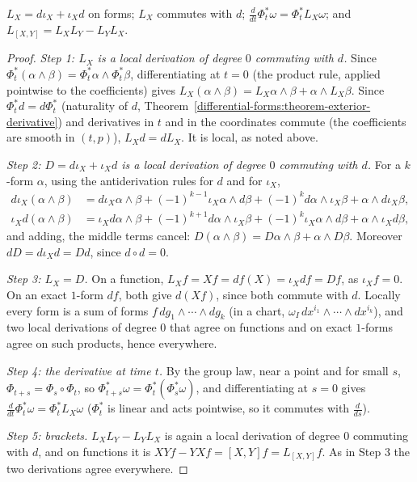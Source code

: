 \begin{proposition}\label{differential-forms:proposition-cartan}
$L_X = d\iota_X + \iota_Xd$ on forms; $L_X$ commutes with $d$; $\frac{d}{dt}\Phi_t^*\omega = \Phi_t^*L_X\omega$; and $L_{[X,Y]} = L_XL_Y - L_YL_X$.
\end{proposition}

\begin{proof}
\emph{Step 1: $L_X$ is a local derivation of degree $0$ commuting with $d$.} Since $\Phi_t^*(\alpha \wedge \beta) = \Phi_t^*\alpha \wedge \Phi_t^*\beta$, differentiating at $t = 0$ (the product
rule, applied pointwise to the coefficients) gives $L_X(\alpha \wedge \beta) = L_X\alpha \wedge \beta + \alpha \wedge L_X\beta$. Since $\Phi_t^*d = d\Phi_t^*$ (naturality of $d$,
Theorem~\ref{differential-forms:theorem-exterior-derivative}) and derivatives in $t$ and in the coordinates commute (the coefficients are smooth in $(t, p)$), $L_Xd = dL_X$. It is local,
as noted above.

\emph{Step 2: $D = d\iota_X + \iota_Xd$ is a local derivation of degree $0$ commuting with $d$.} For a $k$-form $\alpha$, using the antiderivation rules for $d$ and for $\iota_X$,
\[
\begin{aligned}
d\iota_X(\alpha \wedge \beta) &= d\iota_X\alpha \wedge \beta + (-1)^{k-1}\iota_X\alpha \wedge d\beta + (-1)^kd\alpha \wedge \iota_X\beta + \alpha \wedge d\iota_X\beta,\\
\iota_Xd(\alpha \wedge \beta) &= \iota_Xd\alpha \wedge \beta + (-1)^{k+1}d\alpha \wedge \iota_X\beta + (-1)^k\iota_X\alpha \wedge d\beta + \alpha \wedge \iota_Xd\beta,
\end{aligned}
\]
and adding, the middle terms cancel: $D(\alpha \wedge \beta) = D\alpha \wedge \beta + \alpha \wedge D\beta$. Moreover $dD = d\iota_Xd = Dd$, since $d \circ d = 0$.

\emph{Step 3: $L_X = D$.} On a function, $L_Xf = Xf = df(X) = \iota_Xdf = Df$, as $\iota_Xf = 0$. On an exact $1$-form $df$, both give $d(Xf)$, since both commute with $d$. Locally every form
is a sum of forms $f\,dg_1 \wedge \cdots \wedge dg_k$ (in a chart, $\omega_I\,dx^{i_1} \wedge \cdots \wedge dx^{i_k}$), and two local derivations of degree $0$ that agree on functions and on
exact $1$-forms agree on such products, hence everywhere.

\emph{Step 4: the derivative at time $t$.} By the group law, near a point and for small $s$, $\Phi_{t+s} = \Phi_s \circ \Phi_t$, so $\Phi_{t+s}^*\omega = \Phi_t^*(\Phi_s^*\omega)$, and differentiating at
$s = 0$ gives $\frac{d}{dt}\Phi_t^*\omega = \Phi_t^*L_X\omega$ ($\Phi_t^*$ is linear and acts pointwise, so it commutes with $\frac{d}{ds}$).

\emph{Step 5: brackets.} $L_XL_Y - L_YL_X$ is again a local derivation of degree $0$ commuting with $d$, and on functions it is $XY f - YXf = [X, Y]f = L_{[X,Y]}f$. As in Step 3 the
two derivations agree everywhere.
\end{proof}

